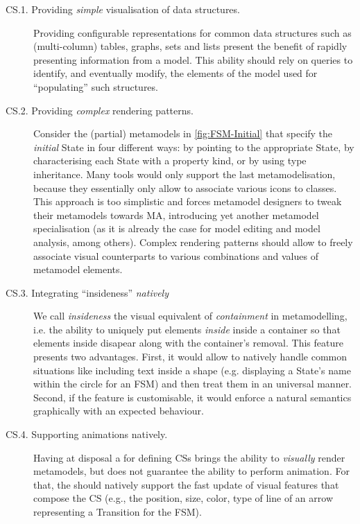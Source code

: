 \begin{description}
   \item[CS.1. Providing \emph{simple} visualisation of data struc\-tures.]
   Pro\-vi\-ding configurable representations for common data structures such as
   (multi-column) tables, graphs, sets and lists present the benefit of rapidly
   presenting information from a model. This ability should rely on queries to
   identify, and eventually modify, the elements of the model used for ``populating''
   such structures. 

	\item[CS.2. Providing \emph{complex} rendering patterns.]
   Consider the (partial) meta\-models in \autoref{fig:FSM-Initial} that
   specify the \emph{initial} \textsf{State} in four different ways: by pointing
   to the appropriate \textsf{State}, by characterising each \textsf{State} with
   a property \textsf{kind}, or by using type inheritance. Many tools would only
   support the last metamodelisation, because they essentially only allow to 
   associate various icons to classes. This approach is too simplistic and forces
   metamodel designers to tweak their metamodels towards MA, introducing yet another
   metamodel specialisation (as it is already the case for model editing and
   model analysis, among others). Complex rendering patterns should allow to freely
   associate visual counterparts to various combinations and values of metamodel
   elements.
   
   \item[CS.3. Integrating ``insideness'' \emph{natively}] We call \emph{insideness}
   the visual equivalent of \emph{containment} in metamodelling, i.e. the ability
   to uniquely put elements \emph{inside} inside a container so that elements 
   inside disapear along with the container's removal. This feature presents two
   advantages. First, it would allow to natively handle common situations like 
   including text inside a shape (e.g. displaying a \textsf{State}'s name within
   the circle for an \textsf{FSM}) and then treat them in an universal manner. 
   Second, if the feature is customisable, it would enforce a natural semantics
   graphically with an expected behaviour. 
   
   \item[CS.4. Supporting animations natively.] Having at disposal a \DSL
   for defining CSs brings the ability to \emph{visually} render metamodels, but
   does not guarantee the ability to perform animation. For that, the \DSL should
   natively support the fast update of visual features that compose the CS (e.g.,
   the position, size, color, type of line of an arrow representing a 
   \textsf{Transition} for the \textsf{FSM}).      
\end{description}